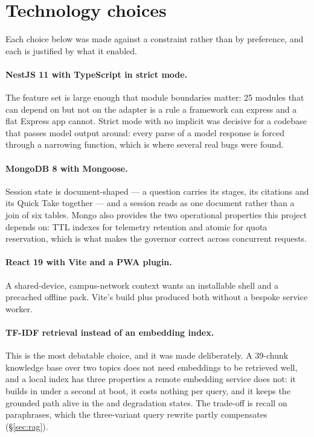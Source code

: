 \section{Technology choices}

Each choice below was made against a constraint rather than by preference, and each is
justified by what it enabled.

\paragraph{NestJS 11 with TypeScript in strict mode.} The feature set is large enough that
module boundaries matter: 25 modules that can depend on  but not on the
adapter is a rule a framework can express and a flat Express app cannot. Strict mode with
no implicit  was decisive for a codebase that passes  model output
around: every parse of a model response is forced through a narrowing function, which is
where several real bugs were found.

\paragraph{MongoDB 8 with Mongoose.} Session state is document-shaped --- a question
carries its stages, its citations and its Quick Take together --- and a session reads as
one document rather than a join of six tables. Mongo also provides the two operational
properties this project depends on: TTL indexes for telemetry retention and atomic
 for quota reservation, which is what makes the governor correct
across concurrent requests.

\paragraph{React 19 with Vite and a PWA plugin.} A shared-device, campus-network context
wants an installable shell and a precached offline pack. Vite's build plus
 produced both without a bespoke service worker.

\paragraph{TF-IDF retrieval instead of an embedding index.} This is the most debatable
choice, and it was made deliberately. A 39-chunk knowledge base over two topics does not
need embeddings to be retrieved well, and a local index has three properties a remote
embedding service does not: it builds in under a second at boot, it costs nothing per
query, and it keeps the grounded path alive in the  and  degradation
states. The trade-off is recall on paraphrases, which the three-variant query rewrite
partly compensates (\S\ref{sec:rag}).

